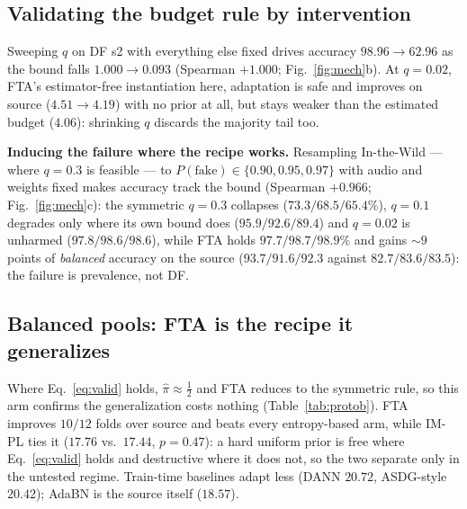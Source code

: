 \documentclass[10pt,letterpaper]{article}
\begin{document}
\subsection{Validating the budget rule by intervention}
Sweeping $q$ on DF s2 with everything else fixed drives accuracy
$98.96\!\to\!62.96$ as the bound falls $1.000\!\to\!0.093$ (Spearman $+1.000$;
Fig.~\ref{fig:mech}b). At $q{=}0.02$, FTA's estimator-free instantiation here,
adaptation is safe and improves on source ($4.51\!\to\!4.19$) with no prior at
all, but stays weaker than the estimated budget ($4.06$): shrinking $q$ discards
the majority tail too.

\textbf{Inducing the failure where the recipe works.} Resampling In-the-Wild ---
where $q{=}0.3$ is feasible --- to $P(\mathrm{fake})\in\{0.90,0.95,0.97\}$ with
audio and weights fixed makes accuracy track the bound (Spearman $+0.966$;
Fig.~\ref{fig:mech}c): the symmetric $q{=}0.3$ collapses ($73.3/68.5/65.4\%$),
$q{=}0.1$ degrades only where its own bound does ($95.9/92.6/89.4$) and
$q{=}0.02$ is unharmed ($97.8/98.6/98.6$), while FTA holds $97.7/98.7/98.9\%$ and
gains $\sim\!9$ points of \emph{balanced} accuracy on the source
($93.7/91.6/92.3$ against $82.7/83.6/83.5$): the failure is prevalence, not DF.

\subsection{Balanced pools: FTA is the recipe it generalizes}
Where Eq.~\eqref{eq:valid} holds, $\hat\pi\!\approx\!\tfrac12$ and FTA reduces to
the symmetric rule, so this arm confirms the generalization costs nothing
(Table~\ref{tab:protob}). FTA improves $10/12$ folds over source and beats every entropy-based arm, while
IM-PL ties it ($17.76$ vs.\ $17.44$, $p{=}0.47$): a hard uniform prior is free
where Eq.~\eqref{eq:valid} holds and destructive where it does not, so the two
separate only in the untested regime. Train-time baselines adapt less (DANN
$20.72$, ASDG-style $20.42$); AdaBN is the source itself ($18.57$).
\end{document}
